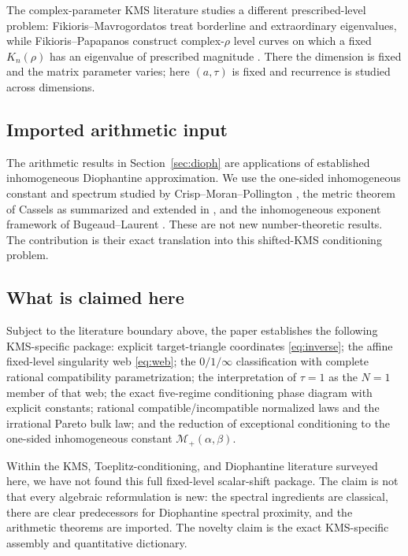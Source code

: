 \documentclass[11pt,reqno]{amsart}
\theoremstyle{plain}
\theoremstyle{definition}
\begin{document}
The complex-parameter KMS literature studies a different prescribed-level problem:
Fikioris--Mavrogordatos treat borderline and extraordinary eigenvalues, while
Fikioris--Papapanos construct complex-$\rho$ level curves on which a fixed
$K_n(\rho)$ has an eigenvalue of prescribed magnitude
\cite{FikiorisMavrogordatos2019,FikiorisPapapanos2021}.  There the dimension is
fixed and the matrix parameter varies; here $(a,\tau)$ is fixed and recurrence is
studied across dimensions.

\subsection*{Imported arithmetic input}
The arithmetic results in Section~\ref{sec:dioph} are applications of established
inhomogeneous Diophantine approximation.  We use the one-sided inhomogeneous
constant and spectrum studied by Crisp--Moran--Pollington
\cite{CrispMoranPollington}, the metric theorem of Cassels \cite{Cassels} as
summarized and extended in \cite{LiaoRams}, and the inhomogeneous exponent framework
of Bugeaud--Laurent \cite{BugeaudLaurent}.  These are not new number-theoretic
results.  The contribution is their exact translation into this shifted-KMS
conditioning problem.

\subsection*{What is claimed here}
Subject to the literature boundary above, the paper establishes the following
KMS-specific package: explicit target-triangle coordinates \eqref{eq:inverse}; the
affine fixed-level singularity web \eqref{eq:web}; the $0/1/\infty$ classification
with complete rational compatibility parametrization; the interpretation of
$\tau=1$ as the $N=1$ member of that web; the exact five-regime conditioning phase
diagram with explicit constants; rational compatible/incompatible normalized laws
and the irrational Pareto bulk law; and the reduction of exceptional conditioning
to the one-sided inhomogeneous constant $\mathcal M_+(\alpha,\beta)$.

Within the KMS, Toeplitz-conditioning, and Diophantine literature surveyed here,
we have not found this full fixed-level scalar-shift package.  The claim is not that
every algebraic reformulation is new: the spectral ingredients are classical, there
are clear predecessors for Diophantine spectral proximity, and the arithmetic
theorems are imported.  The novelty claim is the exact KMS-specific assembly and
quantitative dictionary.
\end{document}
